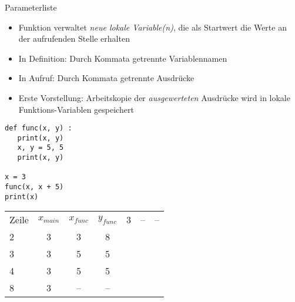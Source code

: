 \begin{frame}[fragile]{Parameterliste}
%
\begin{itemize}
\item Funktion verwaltet \emph{neue lokale Variable(n)}, die als Startwert die Werte an der aufrufenden Stelle erhalten
\item In Definition: Durch Kommata getrennte Variablennamen
\item In Aufruf: Durch Kommata getrennte Ausdrücke
\item Erste Vorstellung: Arbeitskopie der \emph{ausgewerteten} Ausdrücke wird in lokale Funktions-Variablen gespeichert
\end{itemize}
%
\begin{tcbraster}[raster columns=2,
                  raster equal height,
                  nobeforeafter,
                  raster column skip=0.5cm]
\begin{codebox}
\begin{verbatim}
def func(x, y) :
   print(x, y)
   x, y = 5, 5
   print(x, y)

x = 3
func(x, x + 5)
print(x)   
\end{verbatim}
\end{codebox}
%
\begin{tcolorbox}[title=Bild der Speicherstellen]
\scriptsize
\begin{tabular}{l|ccc}
Zeile & $x_{main}$ & $x_{func}$ & $y_{func}$  & 3 & -- & -- \\
2 & 3 &  3 &  8 \\
3 & 3 &  5 &  5 \\
4 & 3 &  5 &  5 \\
8 & 3 & -- & --
\end{tabular}
\end{tcolorbox}
\end{tcbraster}
%
\end{frame}


